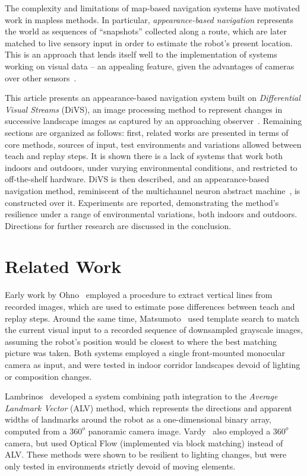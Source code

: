 \documentclass[twocolumn, 9pt,fleqn]{jsproceedings}
\begin{document}
The complexity and limitations of map-based navigation systems have motivated work in mapless methods. In particular, \textit{appearance-based navigation} represents the world as sequences of ``snapshots'' collected along a route, which are later matched to live sensory input in order to estimate the robot's present location. This is an approach that lends itself well to the implementation of systems working on visual data -- an appealing feature, given the advantages of cameras over other sensors~\cite{BON02,DAV07}.

This article presents an appearance-based navigation system built on \textit{Differential Visual Streams} (DiVS), an image processing method to represent changes in successive landscape images as captured by an approaching observer~\cite{HEL14a}. Remaining sections are organized as follows: first, related works are presented in terms of core methods, sources of input, test environments and variations allowed between teach and replay steps. It is shown there is a lack of systems that work both indoors and outdoors, under varying environmental conditions, and restricted to off-the-shelf hardware. DiVS is then described, and an appearance-based navigation method, reminiscent of the multichannel neuron abstract machine~\cite{HEL14b}, is constructed over it. Experiments are reported, demonstrating the method's resilience under a range of environmental variations, both indoors and outdoors. Directions for further research are discussed in the conclusion.

\section{Related Work}

Early work by Ohno~\cite{OYA96} employed a procedure to extract vertical lines from recorded images, which are used to estimate pose differences between teach and replay steps. Around the same time, Matsumoto~\cite{MAT96} used template search to match the current visual input to a recorded sequence of downsampled grayscale images, assuming the robot's position would be closest to where the best matching picture was taken. Both systems employed a single front-mounted monocular camera as input, and were tested in indoor corridor landscapes devoid of lighting or composition changes.

Lambrinos~\cite{LAM00} developed a system combining path integration to the \textit{Average Landmark Vector} (ALV) method, which represents the directions and apparent widths of landmarks around the robot as a one-dimensional binary array, computed from a $360^o$ panoramic camera image. Vardy~\cite{VAR05} also employed a $360^o$ camera, but used Optical Flow (implemented via block matching) instead of ALV. These methods were shown to be resilient to lighting changes, but were only tested in environments strictly devoid of moving elements.
\end{document}
